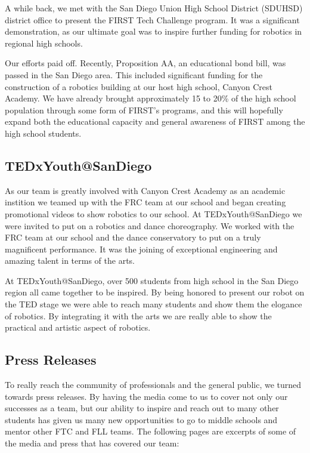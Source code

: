 A while back, we met with the San Diego Union High School District (SDUHSD) district office to present the FIRST Tech Challenge program. It was a significant demonstration, as our ultimate goal was to inspire further funding for robotics in regional high schools.

Our efforts paid off. Recently, Proposition AA, an educational bond bill, was passed in the San Diego area. This included significant funding for the construction of a robotics building at our host high school, Canyon Crest Academy. We have already brought approximately 15 to 20\% of the high school population through some form of FIRST's programs, and this will hopefully expand both the educational capacity and general awareness of FIRST among the high school students.

\subsection{TEDxYouth@SanDiego}
As our team is greatly involved with Canyon Crest Academy as an academic instition we teamed up with the FRC team at our school and began creating promotional videos to show robotics to our school. At TEDxYouth@SanDiego we were invited to put on a robotics and dance choreography. We worked with the FRC team at our school and the dance conservatory to put on a truly magnificent performance. It was the joining of exceptional engineering and amazing talent in terms of the arts. 

At TEDxYouth@SanDiego, over 500 students from high school in the San Diego region all came together to be inspired. By being honored to present our robot on the TED stage we were able to reach many students and show them the elogance of robotics. By integrating it with the arts we are really able to show the practical and artistic aspect of robotics. 

\subsection{Press Releases}
To really reach the community of professionals and the general public, we turned towards press releases. By having the media come to us to cover not only our successes as a team, but our ability to inspire and reach out to many other students has given us many new opportunities to go to middle schools and mentor other FTC and FLL teams. The following pages are excerpts of some of the media and press that has covered our team:



